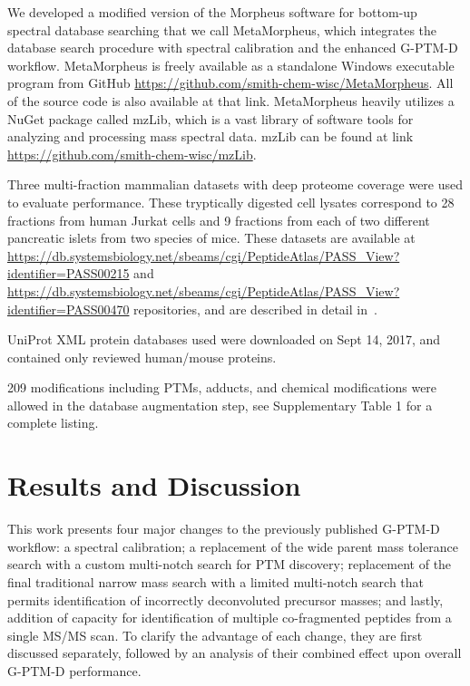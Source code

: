 \documentclass[journal=jprobs,manuscript=article]{achemso}
\begin{document}
We developed a modified version of the Morpheus software for bottom-up spectral database searching\citep{Wenger_2013} that we call MetaMorpheus, which integrates the database search procedure with spectral calibration and the enhanced G-PTM-D workflow.
MetaMorpheus is freely available as a standalone Windows executable program from GitHub \url{https://github.com/smith-chem-wisc/MetaMorpheus}.
All of the source code is also available at that link.
MetaMorpheus heavily utilizes a NuGet package called mzLib, which is a vast library of software tools for analyzing and processing mass spectral data.
mzLib can be found at link \url{https://github.com/smith-chem-wisc/mzLib}.

Three multi-fraction mammalian datasets with deep proteome coverage were used to evaluate performance.
These tryptically digested cell lysates correspond to 28 fractions from human Jurkat cells and 9 fractions from each of two different pancreatic islets from two species of mice.
These datasets are available at \url{https://db.systemsbiology.net/sbeams/cgi/PeptideAtlas/PASS_View?identifier=PASS00215} and \url{https://db.systemsbiology.net/sbeams/cgi/PeptideAtlas/PASS_View?identifier=PASS00470} repositories, and are described in detail in~\citep{Shortreed_2015, Cesnik_2016}.

UniProt XML protein databases used were downloaded on Sept 14, 2017, and contained only reviewed human/mouse proteins.

209 modifications including PTMs, adducts, and chemical modifications were allowed in the database augmentation step, see Supplementary Table 1 for a complete listing.

\section{Results and Discussion}

This work presents four major changes to the previously published G-PTM-D workflow:
a spectral calibration;
a replacement of the wide parent mass tolerance search with a custom multi-notch search for PTM discovery;
replacement of the final traditional narrow mass search with a limited multi-notch search that permits identification of incorrectly deconvoluted precursor masses;
and lastly, addition of capacity for identification of multiple co-fragmented peptides from a single MS/MS scan.
To clarify the advantage of each change, they are first discussed separately, followed by an analysis of their combined effect upon overall G-PTM-D performance.
\end{document}
